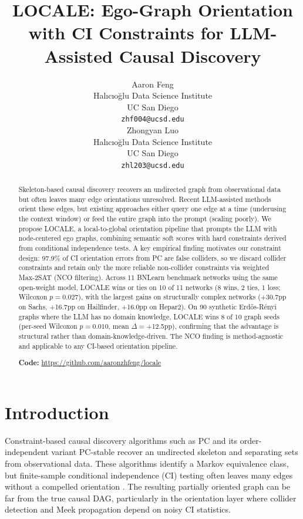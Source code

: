 \documentclass{article}
\title{LOCALE: Ego-Graph Orientation with CI Constraints for LLM-Assisted Causal Discovery}
\author{%
  Aaron Feng \\
  Hal{\i}c{\i}o\u{g}lu Data Science Institute\\
  UC San Diego\\
  \texttt{zhf004@ucsd.edu} \\
  \And
  Zhongyan Luo \\
  Hal{\i}c{\i}o\u{g}lu Data Science Institute\\
  UC San Diego\\
  \texttt{zhl203@ucsd.edu} \\
}
\begin{document}
\maketitle

\begin{abstract}
Skeleton-based causal discovery recovers an undirected graph from observational data but often leaves many edge orientations unresolved. Recent LLM-assisted methods orient these edges, but existing approaches either query one edge at a time (underusing the context window) or feed the entire graph into the prompt (scaling poorly). We propose LOCALE, a local-to-global orientation pipeline that prompts the LLM with node-centered ego graphs, combining semantic soft scores with hard constraints derived from conditional independence tests. A key empirical finding motivates our constraint design: 97.9\% of CI orientation errors from PC are false colliders, so we discard collider constraints and retain only the more reliable non-collider constraints via weighted Max-2SAT (NCO filtering). Across 11 BNLearn benchmark networks using the same open-weight model, LOCALE wins or ties on 10 of 11 networks (8 wins, 2 ties, 1 loss; Wilcoxon $p{=}0.027$), with the largest gains on structurally complex networks (+30.7pp on Sachs, +16.7pp on Hailfinder, +16.0pp on Hepar2). On 90 synthetic Erd\H{o}s-R\'{e}nyi graphs where the LLM has no domain knowledge, LOCALE wins 8 of 10 graph seeds (per-seed Wilcoxon $p{=}0.010$, mean $\Delta{=}$+12.5pp), confirming that the advantage is structural rather than domain-knowledge-driven. The NCO finding is method-agnostic and applicable to any CI-based orientation pipeline.

\vspace{0.5em}
\begin{center}\textbf{Code:} \url{https://github.com/aaronzhfeng/locale}\end{center}
\end{abstract}

\section{Introduction}

Constraint-based causal discovery algorithms such as PC \citep{spirtes2000causation} and its order-independent variant PC-stable \citep{colombo2014order} recover an undirected skeleton and separating sets from observational data. These algorithms identify a Markov equivalence class, but finite-sample conditional independence (CI) testing often leaves many edges without a compelled orientation \citep{uhler2013geometry}. The resulting partially oriented graph can be far from the true causal DAG, particularly in the orientation layer where collider detection and Meek propagation \citep{meek1995causal} depend on noisy CI statistics.
\end{document}

